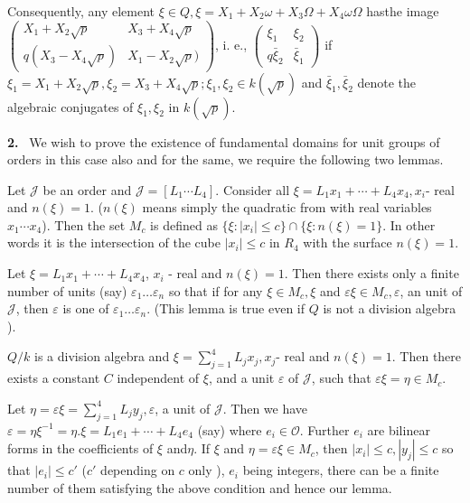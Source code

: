 Consequently, any element $\xi \in Q, \xi= X_1 + X_2 \omega + X_3
\Omega +  X_4 \omega \Omega$ has\pageoriginale the image
$\begin{pmatrix} X_1 + X_2 
  \sqrt{p} & X_3 + X_4 \sqrt {p}\\ q(X_3 - X_4 \sqrt{p}) & X_1 - X_2
  \sqrt{p}) \end{pmatrix}$, i. e., $\begin{pmatrix} \xi_1 & \xi_2 \\ q
  \bar{\xi}_2 & \bar{\xi}_1 \end{pmatrix}$ if $\xi _1 = X_1 + X_2
\sqrt{p}, \xi_2 = X_3 + X_4 \sqrt{p}; \xi_1,  \xi_2 \in k (\sqrt{p})$
and $\bar{\xi}_1,  \bar{\xi}_2$ denote the algebraic conjugates of
$\xi_1,  \xi_2 $ in $k (\sqrt{p})$.  

\textbf{2.}~ We wish to prove the existence of fundamental domains for unit
groups of orders in this case also and for the same, we require the
following two lemmas.  

Let $\mathcal{J}$ be an order and $\mathcal{J}= [ L_1 \cdots
  L_4]$. Consider all $\xi = L_1 x_1 + \cdots + L_4 x_4,  x_i $- real
and $n(\xi) = 1$. ($n (\xi)$ means simply the quadratic from with real
variables $x_1 \cdots x_4$). Then the set $M_c$ is defined as $\{ \xi
: |x_i | \leq c \} \cap \{ \xi : n (\xi) = 1\}$. In other words it is
the intersection of the cube $|x_i| \leq c$ in $R_4$ with the surface
$n(\xi) = 1$.  

\setcounter{Lemma}{0}
\begin{Lemma}\label{chap2:sec4:lem1} %
  Let $\xi = L_1 x_1 + \cdots + L_4 x_4$, $x_i$ - real and $n(\xi) =
  1$. Then there exists only a finite number of units (say)
  $\varepsilon _1 \ldots \varepsilon_n$ so that if for any $\xi \in
  M_c,  \xi $ and $\varepsilon \xi \in M_c,  \varepsilon$, an unit of
  $\mathcal{J}$, then $\varepsilon$ is one of $\varepsilon_1 \ldots
  \varepsilon_n$. (This lemma is true even if $Q$ is not a division
  algebra ).  
\end{Lemma}

\begin{Lemma}\label{chap2:sec4:lem2} %
  $Q/k$ is a division algebra and $\xi = \sum\limits_{j=1}^{4} L_j
  x_j,  x_j $- real and $n (\xi)=1$. Then there exists a constant $C$
  independent of $\xi$, and a unit $\varepsilon$ of $\mathcal{J}$,
  such that $\varepsilon \xi = \eta \in M_c$.  
\end{Lemma}

\setcounter{proofoflemma}{0}
\begin{proofoflemma}\label{chap2:sec4:polem1} %
  Let $\eta = \varepsilon \xi = \sum\limits_{j=1}^{4} L_j y_j,
  \varepsilon $, a unit of $\mathcal{J}$. Then we have $\varepsilon =
  \eta \xi^{-1} = \eta.  \xi = L_1 e_1 + \cdots+ L_4 e_4$ (say) where
  $e_i \in \mathscr{O}$.  Further $e_i$ are bilinear forms in the
  coefficients of $\xi$ and\pageoriginale $\eta$. If $\xi$ and $\eta = \varepsilon
  \xi \in M_c$, then $|x_i | \leq c, |y_j| \leq c$ so that $|e_i| \leq
  c'$ ($c'$ depending on $c$ only ), $e_i$ being integers, there can be
  a finite number of them satisfying the above condition and hence our
  lemma.  
\end{proofoflemma}

